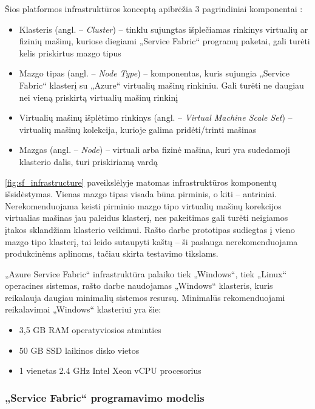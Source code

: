 Šios platformos infrastruktūros konceptą apibrėžia 3 pagrindiniai komponentai \cite{ServiceFabricTerminology}:
\begin{itemize}
    \item Klasteris (angl. -- \textit{Cluster}) -- tinklu sujungtas išplečiamas rinkinys virtualių ar fizinių mašinų, kuriose diegiami „Service Fabric“ programų paketai, gali turėti kelis priskirtus mazgo tipus
    \item Mazgo tipas (angl. -- \textit{Node Type}) -- komponentas, kuris sujungia „Service Fabric“ klasterį su „Azure“ virtualių mašinų rinkiniu. Gali turėti ne daugiau nei vieną priskirtą virtualių mašinų rinkinį
    \item Virtualių mašinų išplėtimo rinkinys (angl. -- \textit{Virtual Machine Scale Set}) -- virtualių mašinų kolekcija, kurioje galima pridėti/trinti mašinas
    \item Mazgas (angl. -- \textit{Node}) -- virtuali arba fizinė mašina, kuri yra sudedamoji klasterio dalis, turi priskiriamą vardą
\end{itemize}

\ref{fig:sf_infrastructure} paveikslėlyje matomas infrastruktūros komponentų išsidėstymas. Vienas mazgo tipas visada būna pirminis, o kiti -- antriniai. Nerekomenduojama keisti pirminio mazgo tipo virtualių mašinų korekcijos virtualias mašinas jau paleidus klasterį, nes pakeitimas gali turėti neigiamos įtakos sklandžiam klasterio veikimui. Rašto darbe prototipas sudiegtas į vieno mazgo tipo klasterį, tai leido sutaupyti kaštų -- ši paslauga nerekomenduojama produkcinėms aplinoms, tačiau skirta testavimo tikslams.



„Azure Service Fabric“ infrastruktūra palaiko tiek „Windows“, tiek „Linux“ operacines sistemas, rašto darbe naudojamas „Windows“ klasteris, kuris reikalauja daugiau minimalių sistemos resursų. Minimalūs rekomenduojami reikalavimai „Windows“ klasteriui yra šie:
\begin{itemize}
    \item 3,5 GB RAM operatyviosios atminties
    \item 50 GB SSD laikinos disko vietos
    \item 1 vienetas 2.4 GHz Intel Xeon vCPU procesorius
\end{itemize}
\subsubsection{„Service Fabric“ programavimo modelis}

